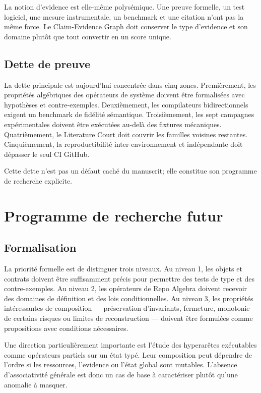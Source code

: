 La notion d'evidence est elle-même polysémique. Une preuve formelle, un test logiciel, une mesure instrumentale, un benchmark et une citation n'ont pas la même force. Le Claim-Evidence Graph doit conserver le type d'evidence et son domaine plutôt que tout convertir en un score unique.

\section{Dette de preuve}

La dette principale est aujourd'hui concentrée dans cinq zones. Premièrement, les propriétés algébriques des opérateurs de système doivent être formalisées avec hypothèses et contre-exemples. Deuxièmement, les compilateurs bidirectionnels exigent un benchmark de fidélité sémantique. Troisièmement, les sept campagnes expérimentales doivent être exécutées au-delà des fixtures mécaniques. Quatrièmement, le Literature Court doit couvrir les familles voisines restantes. Cinquièmement, la reproductibilité inter-environnement et indépendante doit dépasser le seul CI GitHub.

Cette dette n'est pas un défaut caché du manuscrit; elle constitue son programme de recherche explicite.

\chapter{Programme de recherche futur}

\section{Formalisation}

La priorité formelle est de distinguer trois niveaux. Au niveau 1, les objets et contrats doivent être suffisamment précis pour permettre des tests de type et des contre-exemples. Au niveau 2, les opérateurs de Repo Algebra doivent recevoir des domaines de définition et des lois conditionnelles. Au niveau 3, les propriétés intéressantes de composition --- préservation d'invariants, fermeture, monotonie de certains risques ou limites de reconstruction --- doivent être formulées comme propositions avec conditions nécessaires.

Une direction particulièrement importante est l'étude des hyperarêtes exécutables comme opérateurs partiels sur un état typé. Leur composition peut dépendre de l'ordre si les ressources, l'evidence ou l'état global sont mutables. L'absence d'associativité générale est donc un cas de base à caractériser plutôt qu'une anomalie à masquer.

